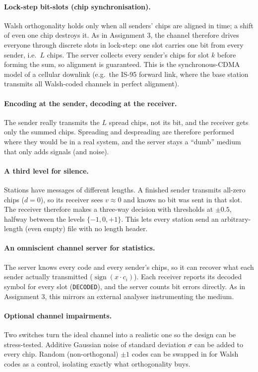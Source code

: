 \documentclass[11pt]{article}
\begin{document}
\paragraph{Lock-step bit-slots (chip synchronisation).} Walsh orthogonality holds only when
all senders' chips are aligned in time; a shift of even one chip destroys it. As in
Assignment 3, the channel therefore drives everyone through discrete slots in lock-step: one
slot carries one bit from every sender, i.e.\ $L$ chips. The server collects every sender's
chips for slot $k$ before forming the sum, so alignment is guaranteed. This is the
synchronous-CDMA model of a cellular downlink (e.g.\ the IS-95 forward link, where the
base station transmits all Walsh-coded channels in perfect alignment).

\paragraph{Encoding at the sender, decoding at the receiver.} The sender really transmits
the $L$ spread chips, not its bit, and the receiver gets only the summed chips. Spreading and
despreading are therefore performed where they would be in a real system, and the server
stays a ``dumb'' medium that only adds signals (and noise).

\paragraph{A third level for silence.} Stations have messages of different lengths. A
finished sender transmits all-zero chips ($d=0$), so its receiver sees $v\approx0$ and knows
no bit was sent in that slot. The receiver therefore makes a three-way decision with
thresholds at $\pm0.5$, halfway between the levels $\{-1,0,+1\}$. This lets every station
send an arbitrary-length (even empty) file with no length header.

\paragraph{An omniscient channel server for statistics.} The server knows every code and
every sender's chips, so it can recover what each sender actually transmitted
($\operatorname{sign}(x\cdot c_i)$). Each receiver reports its decoded symbol for every slot
(\texttt{DECODED}), and the server counts bit errors directly. As in Assignment 3, this
mirrors an external analyser instrumenting the medium.

\paragraph{Optional channel impairments.} Two switches turn the ideal channel into a
realistic one so the design can be stress-tested. Additive Gaussian noise of standard
deviation $\sigma$ can be added to every chip. Random (non-orthogonal) $\pm1$ codes can be
swapped in for Walsh codes as a control, isolating exactly what orthogonality buys.
\end{document}
